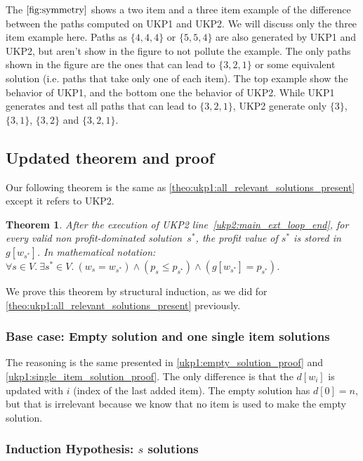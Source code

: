 \documentclass[12pt]{article}
\newtheorem{theorem}{Theorem}
\begin{document}
The \(\autoref{fig:symmetry}\) shows a two item and a three item example of the difference between the paths computed on UKP1 and UKP2. We will discuss only the three item example here. Paths as \(\{4,4,4\}\) or \(\{5,5,4\}\) are also generated by UKP1 and UKP2, but aren't show in the figure to not pollute the example. The only paths shown in the figure are the ones that can lead to \(\{3,2,1\}\) or some equivalent solution (i.e. paths that take only one of each item). The top example show the behavior of UKP1, and the bottom one the behavior of UKP2. While UKP1 generates and test all paths that can lead to \(\{3,2,1\}\), UKP2 generate only \(\{3\}\), \(\{3,1\}\), \(\{3,2\}\) and \(\{3,2,1\}\).

\subsection{Updated theorem and proof}

Our following theorem is the same as \autoref{theo:ukp1:all_relevant_solutions_present} except it refers to UKP2.
\vspace{0.3cm}
\begin{theorem}\label{theo:ukp2:all_relevant_solutions_present}
After the execution of UKP2 line~\ref{ukp2:main_ext_loop_end}, for every valid non profit-dominated solution~\(s^*\), the profit value of \(s^*\) is stored in \(g[w_{s^*}]\). In mathematical notation: \(\forall s \in V.~\exists s^* \in V.~(w_s = w_{s^*}) \land (p_s \leq p_{s^*}) \land (g[w_{s^*}] = p_{s^*})\).
\end{theorem}

\noindent
We prove this theorem by structural induction, as we did for \autoref{theo:ukp1:all_relevant_solutions_present} previously.

\subsubsection{Base case: Empty solution and one single item solutions}

The reasoning is the same presented in \autoref{ukp1:empty_solution_proof} and \autoref{ukp1:single_item_solution_proof}. The only difference is that the \(d[w_i]\) is updated with \(i\) (index of the last added item). The empty solution has \(d[0] = n\), but that is irrelevant because we know that no item is used to make the empty solution.

\subsubsection{Induction Hypothesis: \(s\) solutions}
\end{document}
